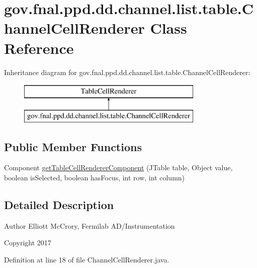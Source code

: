 \hypertarget{classgov_1_1fnal_1_1ppd_1_1dd_1_1channel_1_1list_1_1table_1_1ChannelCellRenderer}{\section{gov.\-fnal.\-ppd.\-dd.\-channel.\-list.\-table.\-Channel\-Cell\-Renderer Class Reference}
\label{classgov_1_1fnal_1_1ppd_1_1dd_1_1channel_1_1list_1_1table_1_1ChannelCellRenderer}
}
Inheritance diagram for gov.\-fnal.\-ppd.\-dd.\-channel.\-list.\-table.\-Channel\-Cell\-Renderer\-:\begin{figure}[H]
\begin{center}
\leavevmode
\includegraphics[height=2.000000cm]{classgov_1_1fnal_1_1ppd_1_1dd_1_1channel_1_1list_1_1table_1_1ChannelCellRenderer}
\end{center}
\end{figure}
\subsection*{Public Member Functions}
\begin{DoxyCompactItemize}
\item 
Component \hyperlink{classgov_1_1fnal_1_1ppd_1_1dd_1_1channel_1_1list_1_1table_1_1ChannelCellRenderer_a5c16a9f6ea6f40ff97232ec3397b24d1}{get\-Table\-Cell\-Renderer\-Component} (J\-Table table, Object value, boolean is\-Selected, boolean has\-Focus, int row, int column)
\end{DoxyCompactItemize}


\subsection{Detailed Description}
\begin{DoxyAuthor}{Author}
Elliott Mc\-Crory, Fermilab A\-D/\-Instrumentation 
\end{DoxyAuthor}
\begin{DoxyCopyright}{Copyright}
2017 
\end{DoxyCopyright}


Definition at line 18 of file Channel\-Cell\-Renderer.\-java.



